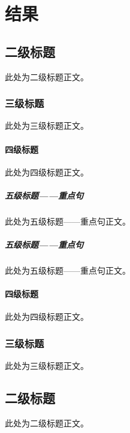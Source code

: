 
\chapter{结果} 
\section{二级标题}
此处为二级标题正文。
\subsection{三级标题}
此处为三级标题正文。
\subsubsection{四级标题}
此处为四级标题正文。
\paragraph{五级标题——重点句}
此处为五级标题——重点句正文。
\paragraph{五级标题——重点句}
此处为五级标题——重点句正文。
\subsubsection{四级标题}
此处为四级标题正文。
\subsection{三级标题}
此处为三级标题正文。
\section{二级标题}
此处为二级标题正文。
